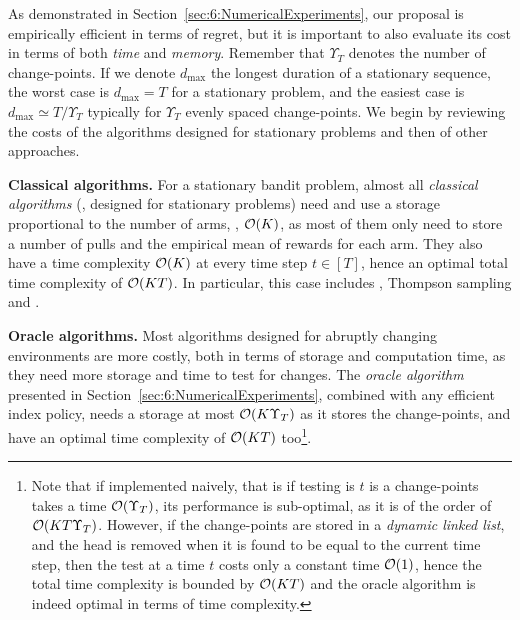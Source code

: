 As demonstrated in Section~\ref{sec:6:NumericalExperiments}, our proposal is empirically efficient in terms of regret, but it is important to also evaluate its cost in terms of both \emph{time} and \emph{memory}.
Remember that $\Upsilon_T$ denotes the number of change-points.
If we denote $d_{\max}$ the longest duration of a stationary sequence, the worst case is $d_{\max} = T$ for a stationary problem, and the easiest case is $d_{\max} \simeq T / \Upsilon_T$ typically for $\Upsilon_T$ evenly spaced change-points.
%
We begin by reviewing the costs of the algorithms designed for stationary problems and then of other approaches.


\textbf{Classical algorithms.}
%
For a stationary bandit problem, almost all \emph{classical algorithms} (\ie, designed for stationary problems) need and use a storage proportional to the number of arms, \ie, $\mathop{}\mathopen{}\mathcal{O}\mathopen{}\left(K\right)$, as most of them only need to store a number of pulls and the empirical mean of rewards for each arm.
They also have a time complexity $\mathop{}\mathopen{}\mathcal{O}\mathopen{}\left(K\right)$ at every time step $t\in[T]$, hence an optimal total time complexity of $\mathop{}\mathopen{}\mathcal{O}\mathopen{}\left(KT\right)$.
In particular, this case includes \UCB, Thompson sampling and \klUCB.

\textbf{Oracle algorithms.}
%
Most algorithms designed for abruptly changing environments are more costly, both in terms of storage and computation time, as they need more storage and time to test for changes.
The \emph{oracle algorithm} presented in Section~\ref{sec:6:NumericalExperiments}, combined with any efficient index policy, needs a storage at most $\mathop{}\mathopen{}\mathcal{O}\mathopen{}\left(K \Upsilon_T\right)$ as it stores the change-points, and have an optimal time complexity of $\mathop{}\mathopen{}\mathcal{O}\mathopen{}\left(K T\right)$
too\footnote{Note that if implemented naively, that is if testing is $t$ is a change-points takes a time $\mathop{}\mathopen{}\mathcal{O}\mathopen{}\left(\Upsilon_T\right)$, its performance is sub-optimal, as it is of the order of $\mathop{}\mathopen{}\mathcal{O}\mathopen{}\left(K T \Upsilon_T\right)$. However, if the change-points are stored in a \emph{dynamic linked list}, and the head is removed when it is found to be equal to the current time step, then the test at a time $t$ costs only a constant time $\mathop{}\mathopen{}\mathcal{O}\mathopen{}\left(1\right)$, hence the total time complexity is bounded by $\mathop{}\mathopen{}\mathcal{O}\mathopen{}\left(K T\right)$ and the oracle algorithm is indeed optimal in terms of time complexity.}.

